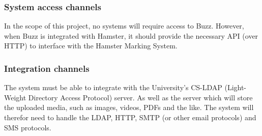 \documentclass[12pt]{article}
\begin{document}
\subsubsection{System access channels}
In the scope of this project, no systems will require access to Buzz. However, when Buzz is integrated with Hamster, it should provide the necessary API (over HTTP) to interface with the Hamster Marking System.

\subsubsection{Integration channels}
The system must be able to integrate with the University's CS-LDAP (Light-Weight Directory Access Protocol) server. As well as the server which will store the uploaded media, such as images, videos, PDFs and the like. The system will therefor need to handle the LDAP, HTTP, SMTP (or other email protocols) and SMS protocols.
\end{document}
